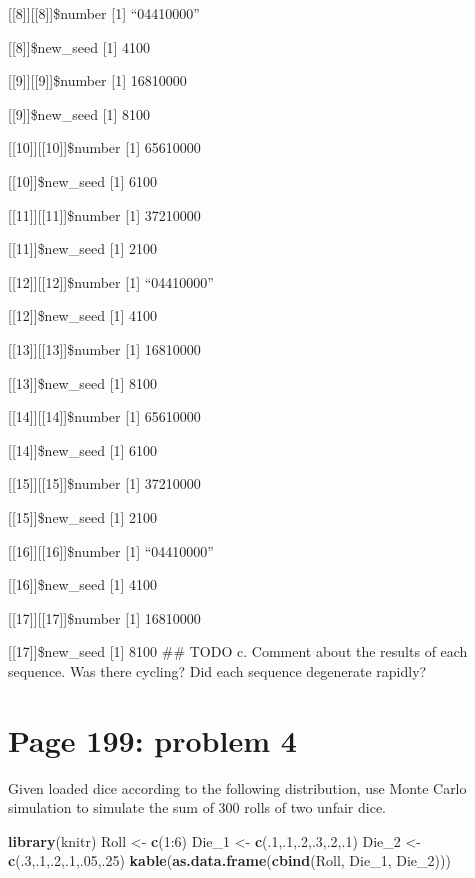 \documentclass[]{article}
\newenvironment{Shaded}{\begin{snugshade}}{\end{snugshade}}
\newcommand{\KeywordTok}[1]{\textcolor[rgb]{0.13,0.29,0.53}{\textbf{{#1}}}}
\newcommand{\DecValTok}[1]{\textcolor[rgb]{0.00,0.00,0.81}{{#1}}}
\newcommand{\StringTok}[1]{\textcolor[rgb]{0.31,0.60,0.02}{{#1}}}
\newcommand{\NormalTok}[1]{{#1}}
\begin{document}
{[}{[}8{]}{]}{[}{[}8{]}{]}\$number {[}1{]} ``04410000''

{[}{[}8{]}{]}\$new\_seed {[}1{]} 4100

{[}{[}9{]}{]}{[}{[}9{]}{]}\$number {[}1{]} 16810000

{[}{[}9{]}{]}\$new\_seed {[}1{]} 8100

{[}{[}10{]}{]}{[}{[}10{]}{]}\$number {[}1{]} 65610000

{[}{[}10{]}{]}\$new\_seed {[}1{]} 6100

{[}{[}11{]}{]}{[}{[}11{]}{]}\$number {[}1{]} 37210000

{[}{[}11{]}{]}\$new\_seed {[}1{]} 2100

{[}{[}12{]}{]}{[}{[}12{]}{]}\$number {[}1{]} ``04410000''

{[}{[}12{]}{]}\$new\_seed {[}1{]} 4100

{[}{[}13{]}{]}{[}{[}13{]}{]}\$number {[}1{]} 16810000

{[}{[}13{]}{]}\$new\_seed {[}1{]} 8100

{[}{[}14{]}{]}{[}{[}14{]}{]}\$number {[}1{]} 65610000

{[}{[}14{]}{]}\$new\_seed {[}1{]} 6100

{[}{[}15{]}{]}{[}{[}15{]}{]}\$number {[}1{]} 37210000

{[}{[}15{]}{]}\$new\_seed {[}1{]} 2100

{[}{[}16{]}{]}{[}{[}16{]}{]}\$number {[}1{]} ``04410000''

{[}{[}16{]}{]}\$new\_seed {[}1{]} 4100

{[}{[}17{]}{]}{[}{[}17{]}{]}\$number {[}1{]} 16810000

{[}{[}17{]}{]}\$new\_seed {[}1{]} 8100 \#\# TODO c. Comment about the
results of each sequence. Was there cycling? Did each sequence
degenerate rapidly?

\section{Page 199: problem 4}\label{page-199-problem-4}

Given loaded dice according to the following distribution, use Monte
Carlo simulation to simulate the sum of 300 rolls of two unfair dice.

\begin{Shaded}
\begin{Highlighting}[]
\KeywordTok{library}\NormalTok{(knitr)}
\NormalTok{Roll <-}\StringTok{ }\KeywordTok{c}\NormalTok{(}\DecValTok{1}\NormalTok{:}\DecValTok{6}\NormalTok{)}
\NormalTok{Die_1 <-}\StringTok{ }\KeywordTok{c}\NormalTok{(.}\DecValTok{1}\NormalTok{,.}\DecValTok{1}\NormalTok{,.}\DecValTok{2}\NormalTok{,.}\DecValTok{3}\NormalTok{,.}\DecValTok{2}\NormalTok{,.}\DecValTok{1}\NormalTok{)}
\NormalTok{Die_2 <-}\StringTok{ }\KeywordTok{c}\NormalTok{(.}\DecValTok{3}\NormalTok{,.}\DecValTok{1}\NormalTok{,.}\DecValTok{2}\NormalTok{,.}\DecValTok{1}\NormalTok{,.}\DecValTok{05}\NormalTok{,.}\DecValTok{25}\NormalTok{)}
\KeywordTok{kable}\NormalTok{(}\KeywordTok{as.data.frame}\NormalTok{(}\KeywordTok{cbind}\NormalTok{(Roll, Die_1, Die_2)))}
\end{Highlighting}
\end{Shaded}
\end{document}
